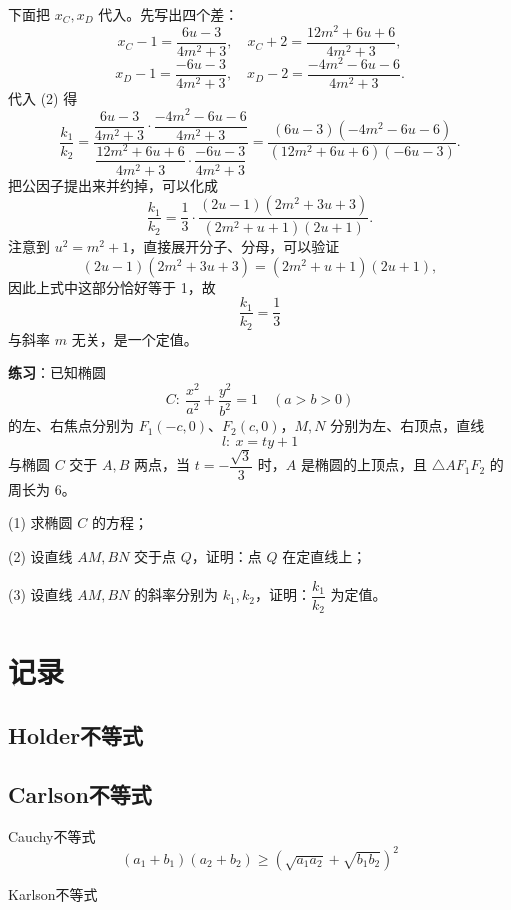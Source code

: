 \documentclass{article}
\begin{document}
   下面把 \(x_C, x_D\) 代入。先写出四个差：
   \[
   x_C - 1 = \frac{6u - 3}{4m^{2}+3}, \quad
   x_C + 2 = \frac{12m^{2} + 6u + 6}{4m^{2}+3},
   \]
   \[
   x_D - 1 = \frac{-6u - 3}{4m^{2}+3}, \quad
   x_D - 2 = \frac{-4m^{2} - 6u - 6}{4m^{2}+3}.
   \]
   代入 (2) 得
   \[
   \frac{k_1}{k_2}
   = \frac{\dfrac{6u - 3}{4m^{2}+3} \cdot \dfrac{-4m^{2} - 6u - 6}{4m^{2}+3}}
   {\dfrac{12m^{2} + 6u + 6}{4m^{2}+3} \cdot \dfrac{-6u - 3}{4m^{2}+3}}
   = \frac{(6u - 3)(-4m^{2} - 6u - 6)}{(12m^{2} + 6u + 6)(-6u - 3)}.
   \]
   把公因子提出来并约掉，可以化成
   \[
   \frac{k_1}{k_2} = \frac{1}{3} \cdot
   \frac{(2u - 1)(2m^{2} + 3u + 3)}{(2m^{2} + u + 1)(2u + 1)}.
   \]
   注意到 \(u^{2} = m^{2} + 1\)，直接展开分子、分母，可以验证
   \[
   (2u - 1)(2m^{2} + 3u + 3) = (2m^{2} + u + 1)(2u + 1),
   \]
   因此上式中这部分恰好等于 1，故
   \[
   \boxed{\frac{k_1}{k_2} = \frac{1}{3}}
   \]
   与斜率 \(m\) 无关，是一个定值。
   
   
   \medskip
   
   \textbf{练习}：已知椭圆
   \[
   C:\ \frac{x^{2}}{a^{2}}+\frac{y^{2}}{b^{2}}=1 \quad (a>b>0)
   \]
   的左、右焦点分别为 \(F_{1}(-c,0)\)、\(F_{2}(c,0)\)，\(M,N\) 分别为左、右顶点，直线
   \[
   l:\ x=ty+1
   \]
   与椭圆 \(C\) 交于 \(A,B\) 两点，当 \(t=-\dfrac{\sqrt{3}}{3}\) 时，\(A\) 是椭圆的上顶点，且 \(\triangle AF_{1}F_{2}\) 的周长为 \(6\)。
   
   (1) 求椭圆 \(C\) 的方程；
   
   (2) 设直线 \(AM, BN\) 交于点 \(Q\)，证明：点 \(Q\) 在定直线上；
   
   (3) 设直线 \(AM, BN\) 的斜率分别为 \(k_{1},k_{2}\)，证明：\(\dfrac{k_{1}}{k_{2}}\) 为定值。
   
   
   \section{记录}
   
   \subsection{Holder不等式}
   
   \subsection{Carlson不等式}
   
 
   Cauchy不等式
   \[
   (a_1 + b_1)(a_2 + b_2) \geq  ( \sqrt{a_1 a_2} + \sqrt{b_1 b_2})^2 
   \]

	Karlson不等式
	
\end{document}
